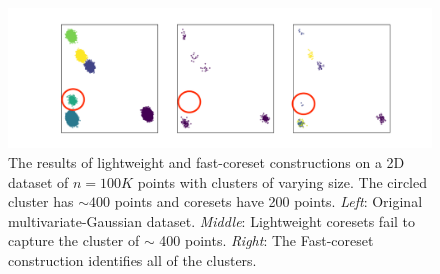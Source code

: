 \begin{figure}
\centering
\hspace*{-0.1cm}
\includegraphics[trim={4cm 0 0 0},clip,width=1.13\linewidth]{images/lightweight_breaks.png}
\vspace*{-0.8cm}
\caption{
The results of lightweight and fast-coreset constructions on a 2D dataset of $n=100K$ points with clusters of varying size. The circled cluster has $\sim 400$
points and coresets have 200 points.
\emph{Left}: Original multivariate-Gaussian dataset.
\emph{Middle}: Lightweight coresets fail to capture the cluster of $\sim$ 400 points.
\emph{Right}: The Fast-coreset construction identifies all of the clusters.
}
\label{fig:lightweight_breaks}
\end{figure}
